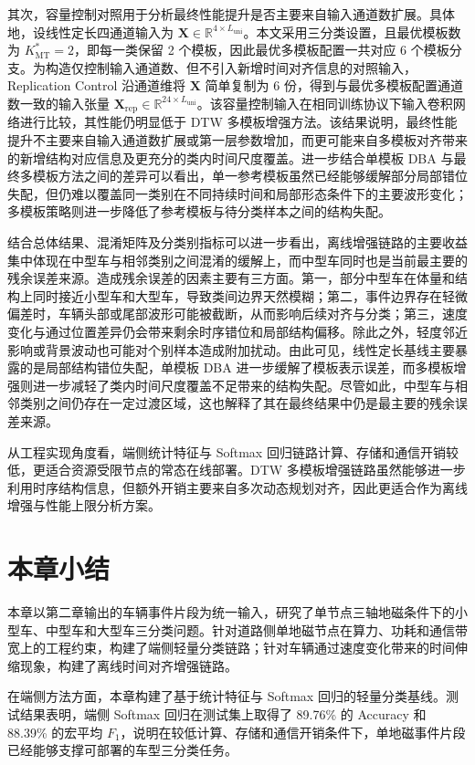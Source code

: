 \documentclass{xdupgthesis}
\begin{document}
其次，容量控制对照用于分析最终性能提升是否主要来自输入通道数扩展。具体地，设线性定长四通道输入为 $\mathbf{X}\in\mathbb{R}^{4\times L_{\mathrm{uni}}}$。本文采用三分类设置，且最优模板数为 $K_{\mathrm{MT}}^\ast=2$，即每一类保留 2 个模板，因此最优多模板配置一共对应 6 个模板分支。为构造仅控制输入通道数、但不引入新增时间对齐信息的对照输入，Replication Control 沿通道维将 $\mathbf{X}$ 简单复制为 6 份，得到与最优多模板配置通道数一致的输入张量 $\mathbf{X}_{\mathrm{rep}}\in\mathbb{R}^{24\times L_{\mathrm{uni}}}$。该容量控制输入在相同训练协议下输入卷积网络进行比较，其性能仍明显低于 DTW 多模板增强方法。该结果说明，最终性能提升不主要来自输入通道数扩展或第一层参数增加，而更可能来自多模板对齐带来的新增结构对应信息及更充分的类内时间尺度覆盖。进一步结合单模板 DBA 与最终多模板方法之间的差异可以看出，单一参考模板虽然已经能够缓解部分局部错位失配，但仍难以覆盖同一类别在不同持续时间和局部形态条件下的主要波形变化；多模板策略则进一步降低了参考模板与待分类样本之间的结构失配。

结合总体结果、混淆矩阵及分类别指标可以进一步看出，离线增强链路的主要收益集中体现在中型车与相邻类别之间混淆的缓解上，而中型车同时也是当前最主要的残余误差来源。造成残余误差的因素主要有三方面。第一，部分中型车在体量和结构上同时接近小型车和大型车，导致类间边界天然模糊；第二，事件边界存在轻微偏差时，车辆头部或尾部波形可能被截断，从而影响后续对齐与分类；第三，速度变化与通过位置差异仍会带来剩余时序错位和局部结构偏移。除此之外，轻度邻近影响或背景波动也可能对个别样本造成附加扰动。由此可见，线性定长基线主要暴露的是局部结构错位失配，单模板 DBA 进一步缓解了模板表示误差，而多模板增强则进一步减轻了类内时间尺度覆盖不足带来的结构失配。尽管如此，中型车与相邻类别之间仍存在一定过渡区域，这也解释了其在最终结果中仍是最主要的残余误差来源。

从工程实现角度看，端侧统计特征与 Softmax 回归链路计算、存储和通信开销较低，更适合资源受限节点的常态在线部署。DTW 多模板增强链路虽然能够进一步利用时序结构信息，但额外开销主要来自多次动态规划对齐，因此更适合作为离线增强与性能上限分析方案。


\section{本章小结}
\label{sec:ch3_summary}

本章以第二章输出的车辆事件片段为统一输入，研究了单节点三轴地磁条件下的小型车、中型车和大型车三分类问题。针对道路侧单地磁节点在算力、功耗和通信带宽上的工程约束，构建了端侧轻量分类链路；针对车辆通过速度变化带来的时间伸缩现象，构建了离线时间对齐增强链路。

在端侧方法方面，本章构建了基于统计特征与 Softmax 回归的轻量分类基线。测试结果表明，端侧 Softmax 回归在测试集上取得了 89.76\% 的 Accuracy 和 88.39\% 的宏平均 $F_1$，说明在较低计算、存储和通信开销条件下，单地磁事件片段已经能够支撑可部署的车型三分类任务。
\end{document}
